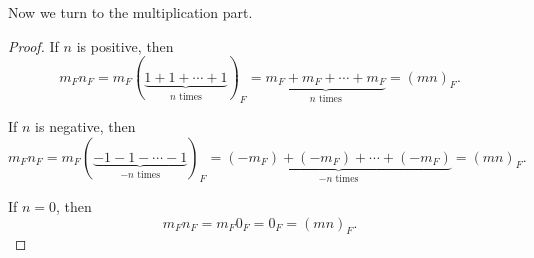 \documentclass[../../../main.tex]{subfiles}
\begin{document}
Now we turn to the multiplication part.

\begin{proof}
	If $n$ is positive, then
	\[
		m_F n_F
		=
		m_F
		\left(
			\underbrace{1 + 1 + \cdots + 1}_{n \text{ times}}
		\right)_F
		=
		\underbrace{m_F + m_F + \cdots + m_F}_{n \text{ times}}
		=
		(mn)_F.
	\]

	If $n$ is negative, then
	\[
		m_F n_F
		=
		m_F
		\left(
			\underbrace{-1 - 1 - \cdots - 1}_{-n \text{ times}}
		\right)_F
		=
		\underbrace{(-m_F) + (-m_F) + \cdots + (-m_F)}_{-n \text{ times}}
		=
		(mn)_F.
	\]

	If $n = 0$, then
	\[
		m_F n_F = m_F 0_F = 0_F = (mn)_F.
	\]
\end{proof}
\end{document}
